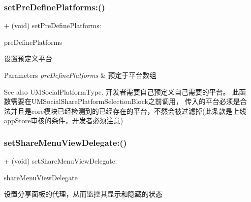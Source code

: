 \subsubsection{\texorpdfstring{set\+Pre\+Define\+Platforms\+:()}{setPreDefinePlatforms:()}\hspace{0.1cm}{\footnotesize\ttfamily [2/2]}}
{\footnotesize\ttfamily + (void) set\+Pre\+Define\+Platforms\+: \begin{DoxyParamCaption}\item[{(N\+S\+Array $\ast$)}]{pre\+Define\+Platforms }\end{DoxyParamCaption}}

设置预定义平台


\begin{DoxyParams}{Parameters}
{\em pre\+Define\+Platforms} & 预定于平台数组\\
\hline
\end{DoxyParams}
\begin{DoxySeeAlso}{See also}
U\+M\+Social\+Platform\+Type. 开发者需要自己预定义自己需要的平台。 此函数需要在\+U\+M\+Social\+Share\+Platform\+Selection\+Block之前调用， 传入的平台必须是合法并且是core模块已经检测到的已经存在的平台，不然会被过滤掉(此条款是上线app\+Store审核的条件，开发者必须注意) 
\end{DoxySeeAlso}
\mbox{\label{interface_u_m_social_u_i_manager_a8480265f40588af964bd7b639af74edd}} 
\subsubsection{\texorpdfstring{set\+Share\+Menu\+View\+Delegate\+:()}{setShareMenuViewDelegate:()}\hspace{0.1cm}{\footnotesize\ttfamily [1/2]}}
{\footnotesize\ttfamily + (void) set\+Share\+Menu\+View\+Delegate\+: \begin{DoxyParamCaption}\item[{(id$<$ U\+M\+Social\+Share\+Menu\+View\+Delegate $>$)}]{share\+Menu\+View\+Delegate }\end{DoxyParamCaption}}

设置分享面板的代理，从而监控其显示和隐藏的状态


